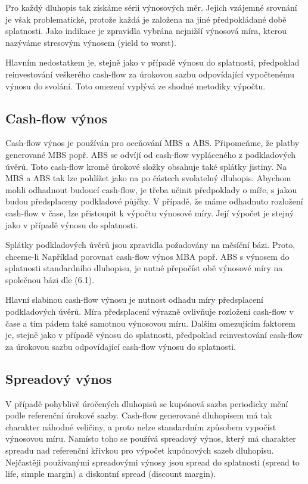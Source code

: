 \documentclass[a4paper]{book}
\begin{document}
Pro každý dluhopis tak získáme sérii výnosových měr. Jejich vzájemné srovnání je však problematické, protože každá je založena na jiné předpokládané době splatnosti. Jako indikace je zpravidla vybrána nejnižší výnosová míra, kterou nazýváme stresovým výnosem (yield to worst).

Hlavním nedostatkem je, stejně jako v případě výnosu do splatnosti, předpoklad reinvestování veškerého cash-flow za úrokovou sazbu odpovídající vypočtenému výnosu do svolání. Toto omezení vyplývá ze shodné metodiky výpočtu.

\subsection{Cash-flow výnos}

Cash-flow výnos je používán pro oceňování MBS a ABS. Připomeňme, že platby generované MBS popř. ABS se odvíjí od cash-flow vypláceného z podkladových úvěrů. Toto cash-flow kromě úrokové složky obsahuje také splátky jistiny. Na MBS a ABS tak lze pohlížet jako na po částech svolatelný dluhopis. Abychom mohli odhadnout budoucí cash-flow, je třeba učinit předpoklady o míře, s jakou budou předsplaceny podkladové půjčky. V případě, že máme odhadnuto rozložení cash-flow v čase, lze přistoupit k výpočtu výnosové míry. Její výpočet je stejný jako v případě výnosu do splatnosti.

Splátky podkladových úvěrů jsou zpravidla požadovány na měsíční bázi. Proto, chceme-li Například porovnat cash-flow výnos MBA popř. ABS s výnosem do splatnosti standardního dluhopisu, je nutné přepočíst obě výnosové míry na společnou bázi dle (6.1).

Hlavní slabinou cash-flow výnosu je nutnost odhadu míry předsplacení podkladových úvěrů. Míra předsplacení výrazně ovlivňuje rozložení cash-flow v čase a tím pádem také samotnou výnosovou míru. Dalším omezujícím faktorem je, stejně jako v případě výnosu do splatnosti, předpoklad reinvestování cash-flow za úrokovou sazbu odpovídající cash-flow výnosu do splatnosti. 

\subsection{Spreadový výnos}

V případě pohyblivě úročených dluhopisů se kupónová sazba periodicky mění podle referenční úrokové sazby. Cash-flow generované dluhopisem má tak charakter náhodné veličiny, a proto nelze standardním způsobem vypočíst výnosovou míru. Namísto toho se používá spreadový výnos, který má charakter spreadu nad referenční křivkou pro výpočet kupónových sazeb dluhopisu. Nejčastěji používanými spreadovými výnosy jsou spread do splatnosti (spread to life, simple margin) a diskontní spread (discount margin).
\end{document}

